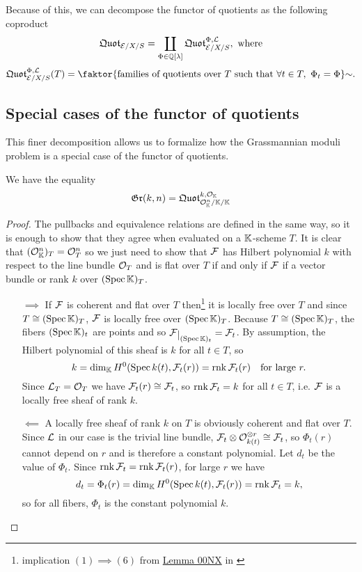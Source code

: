 Because of this, we can decompose the functor of quotients as the following coproduct
\[\mathfrak{Quot}_{\mathcal{E}/X/S}=\coprod_{\Phi\in\mathbb{Q}[\lambda]}\mathfrak{Quot}^{\Phi,\mathcal{L}}_{\mathcal{E}/X/S},\text{ where}\]
\[\quotf^{\Phi,\Lc}_{\Ec/X/S}(T)=\quot{\cpa{\text{families of quotients over $T$ such that $\forall t\in T,\ \Phi_t=\Phi$}}}\sim.\]

\subsection{Special cases of the functor of quotients}
This finer decomposition allows us to formalize how the Grassmannian moduli problem is a special case of the functor of quotients.
\begin{proposition}
We have the equality
\[\mathfrak{Gr}(k,n)=\mathfrak{Quot}^{k,\mathcal{O}_{\mathbb{K}}}_{\mathcal{O}_{\mathbb{K}}^n/\mathbb{K}/\mathbb{K}}\]
\end{proposition}
\begin{proof}
The pullbacks and equivalence relations are defined in the same way, so it is enough to show that they agree when evaluated on a $\mathbb{K}$-scheme $T$. It is clear that $(\mathcal{O}_{\mathbb{K}}^n)_T=\mathcal{O}_T^n$ so we just need to show that $\mathcal{F}$ has Hilbert polynomial $k$ with respect to the line bundle $\mathcal{O}_T$ and is flat over $T$ if and only if $\mathcal{F}$ if a vector bundle or rank $k$ over $(\mathrm{Spec}\, \mathbb{K})_T$. 
\setlength{\leftmargini}{0cm}
\begin{itemize}
\item[$\boxed{\implies}$] If $\mathcal{F}$ is coherent and flat over $T$ then\footnote{implication $(1)\implies (6)$ from \href{https://stacks.math.columbia.edu/tag/00NX}{Lemma 00NX} in \cite{stacks}} it is locally free over $T$ and since $T\cong(\mathrm{Spec}\,\mathbb{K})_T$, $\mathcal{F}$ is locally free over $(\mathrm{Spec}\,\mathbb{K})_T$. Because $T\cong(\mathrm{Spec}\,\mathbb{K})_T$, the fibers $(\mathrm{Spec}\,\mathbb{K})_t$ are points and so $\Fc\res{(\Spec \K)_t}=\Fc_t$. By assumption, the Hilbert polynomial of this sheaf is $k$ for all $t\in T$, so 
\[k=\dim_{\mathbb{K}} H^0(\mathrm{Spec}\, k(t),\mathcal{F}_t(r))=\mathrm{rnk}\, \mathcal{F}_t(r)\quad \text{for large }r.\]
Since $\mathcal{L}_T=\mathcal{O}_T$ we have $\mathcal{F}_t(r)\cong \mathcal{F}_t$, so $\mathrm{rnk}\, \mathcal{F}_t=k$ for all $t\in T$, i.e. $\mathcal{F}$ is a locally free sheaf of rank $k$.
\item[$\boxed{\impliedby}$] A locally free sheaf of rank $k$ on $T$ is obviously coherent and flat over $T$. Since $\mathcal{L}$ in our case is the trivial line bundle, $\mathcal{F}_t\otimes \mathcal{O}_{k(t)}^{\otimes r}\cong \mathcal{F}_t$, so $\Phi_t(r)$ cannot depend on $r$ and is therefore a constant polynomial. Let $d_t$ be the value of $\Phi_t$. Since $\mathrm{rnk}\, \mathcal{F}_t=\mathrm{rnk}\, \mathcal{F}_t(r)$, for large $r$ we have 
\[d_t=\Phi_t(r)=\dim_{\mathbb{K}} H^0(\mathrm{Spec}\, k(t), \mathcal{F}_t(r))=\mathrm{rnk}\,\mathcal{F}_t=k,\]
so for all fibers, $\Phi_t$ is the constant polynomial $k$.
\end{itemize}
\setlength{\leftmargini}{0.5cm}
\end{proof}


